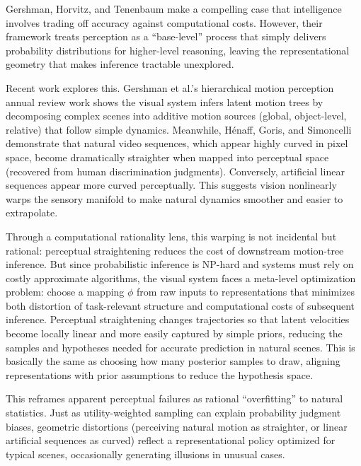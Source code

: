 \documentclass{article}
\begin{document}
Gershman, Horvitz, and Tenenbaum make a compelling case that intelligence involves trading off accuracy against computational costs. However, their framework treats perception as a ``base-level'' process that simply delivers probability distributions for higher-level reasoning, leaving the representational geometry that makes inference tractable unexplored.

Recent work explores this. Gershman et al.'s hierarchical motion perception annual review work shows the visual system infers latent motion trees by decomposing complex scenes into additive motion sources (global, object-level, relative) that follow simple dynamics. Meanwhile, Hénaff, Goris, and Simoncelli demonstrate that natural video sequences, which appear highly curved in pixel space, become dramatically straighter when mapped into perceptual space (recovered from human discrimination judgments). Conversely, artificial linear sequences appear more curved perceptually. This suggests vision nonlinearly warps the sensory manifold to make natural dynamics smoother and easier to extrapolate.

Through a computational rationality lens, this warping is not incidental but rational: perceptual straightening reduces the cost of downstream motion-tree inference. But since probabilistic inference is NP-hard and systems must rely on costly approximate algorithms, the visual system faces a meta-level optimization problem: choose a mapping $\phi$ from raw inputs to representations that minimizes both distortion of task-relevant structure and computational costs of subsequent inference. Perceptual straightening changes trajectories so that latent velocities become locally linear and more easily captured by simple priors, reducing the samples and hypotheses needed for accurate prediction in natural scenes. This is basically the same as choosing how many posterior samples to draw, aligning representations with prior assumptions to reduce the hypothesis space.

This reframes apparent perceptual failures as rational ``overfitting'' to natural statistics. Just as utility-weighted sampling can explain probability judgment biases, geometric distortions (perceiving natural motion as straighter, or linear artificial sequences as curved) reflect a representational policy optimized for typical scenes, occasionally generating illusions in unusual cases.
\end{document}

